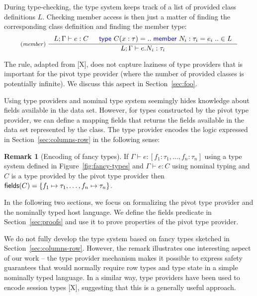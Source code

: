 \documentclass[a4paper,UKenglish]{lipics-v2016}
\theoremstyle{plain}
\theoremstyle{definition}
\newtheorem{rmrk}{Remark}
\newcommand{\kvd}[1]{\textnormal{\textcolor{kvdclr}{\sffamily #1}}}
\newcommand{\ident}[1]{\textnormal{\sffamily #1}}
\begin{document}
\noindent
During type-checking, the type system keeps track of a list of provided class definitions $L$. 
Checking member access is then just a matter of finding the corresponding class definition and
finding the member type:
%
\begin{equation*}
\inference[(\emph{member})~]
  {L; \Gamma \vdash e : C & \kvd{type}~C(x:\tau) = ..\;\kvd{member}~N_i : \tau_i = e_i\;.. \in L}
  {L; \Gamma \vdash e.N_i:\tau_i}
\end{equation*}

\noindent
The rule, adapted from [X], does not capture laziness of type providers that is 
important for the pivot type provider (where the number of provided classes is potentially 
infinite). We discuss this aspect in Section~\ref{sec:foo}.

Using type providers and nominal type system seemingly hides knowledge about fields available
in the data set. However, for types constructed by the pivot type provider, we can define a 
mapping \ident{fields} that returns the fields available in the data set represented by the 
class. The type provider encodes the logic expressed in Section~\ref{sec:columns-row} in the
following sense:

\begin{rmrk}[Encoding of fancy types]
\label{thm:encoding-fancy}
If $\Gamma\vdash e:[f_1\!:\!\tau_1, \ldots, f_n\!:\!\tau_n]$ using a type system defined in 
Figure~\ref{fig:fancy-types} and $\Gamma\vdash e:C$ using nominal typing and $C$ is a type 
provided by the pivot type provider then $\ident{fields}(C) = \{ f_1\mapsto\tau_1, \ldots, f_n\mapsto\tau_n \}$.
\end{rmrk}

\noindent
In the following two sections, we focus on formalizing the pivot type provider and the nominally 
typed host language. We define the \ident{fields} predicate in Section~\ref{sec:proofs} and use it 
to prove properties of the pivot type provider.

We do not fully develop the type system based on fancy types sketched in Section~\ref{sec:columns-row}.
However, the remark illustrates one interesting aspect of our work -- the type provider 
mechanism makes it possible to express safety guarantees that would normally require row types and 
type state in a simple nominally typed language. In a similar way, type providers have been used
to encode session types [X], suggesting that this is a generally useful approach.

\end{document}
